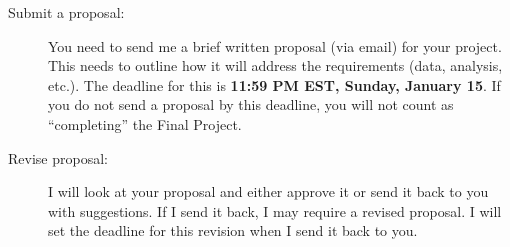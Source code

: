 \documentclass{tufte-handout}
\begin{document}
\begin{description}
\item[{Submit a proposal:}]  You need to send me a brief written proposal (via email) for your project. This needs to outline how it will address the requirements (data, analysis, etc.). The deadline for this is \textbf{11:59 PM EST, Sunday, January 15}. If you do not send a proposal by this deadline, you will not count as ``completing'' the Final Project.
\item[{Revise proposal:}] I will look at your proposal and either approve it or send it back to you with suggestions. If I send it back, I may require a revised proposal. I will set the deadline for this revision when I send it back to you.
\end{description}
\newpage
\end{document}
